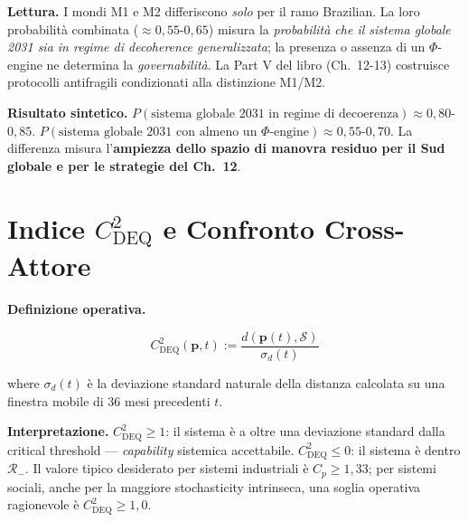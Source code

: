 \Hypoth{} \textbf{Lettura.} I mondi M1 e M2 differiscono \emph{solo} per
il ramo Brazilian. La loro probabilità combinata
(\(\approx 0{,}55\)-\(0{,}65\)) misura la \emph{probabilità che il
sistema globale 2031 sia in regime di decoherence generalizzata}; la
presenza o assenza di un \(\Phi\)-engine ne determina la
\emph{governabilità}. La Part V del libro (Ch.~12-13) costruisce
protocolli antifragili condizionati alla distinzione M1/M2.

\Proved{} \textbf{Risultato sintetico.}
\(P(\text{sistema globale 2031 in regime di decoerenza}) \approx 0{,}80\)-\(0{,}85\).
\(P(\text{sistema globale 2031 con almeno un $\Phi$-engine}) \approx 0{,}55\)-\(0{,}70\).
La differenza misura l'\textbf{ampiezza dello spazio di manovra residuo
per il Sud globale e per le strategie del Ch.~12}.



\section{\texorpdfstring{Indice \(C_{\text{DEQ}}^2\) e Confronto
Cross-Attore}{Indice C\_\{\textbackslash text\{DEQ\}\}\^{}2 e Confronto Cross-Attore}}\label{indice-c_textdeq2-e-confronto-cross-attore}

\Hypoth{} \textbf{Definizione operativa.}

\[
C_{\text{DEQ}}^2(\boldsymbol{p}, t) := \frac{d(\boldsymbol{p}(t), \mathcal{S})}{\sigma_d(t)}
\]

where \(\sigma_d(t)\) è la deviazione standard naturale della distanza
calcolata su una finestra mobile di 36 mesi precedenti \(t\).

\Proved{} \textbf{Interpretazione.} \(C_{\text{DEQ}}^2 \geq 1\): il
sistema è a oltre una deviazione standard dalla critical threshold ---
\emph{capability} sistemica accettabile. \(C_{\text{DEQ}}^2 \leq 0\): il
sistema è dentro \(\mathcal{R}_-\). Il valore tipico desiderato per
sistemi industriali è \(C_p \geq 1{,}33\); per sistemi sociali, anche
per la maggiore stochasticity intrinseca, una soglia operativa
ragionevole è \(C_{\text{DEQ}}^2 \geq 1{,}0\).

